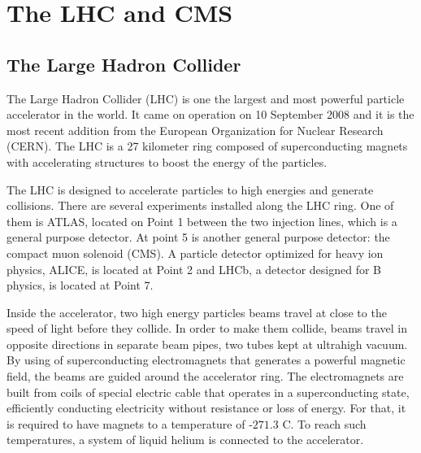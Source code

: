 
\chapter{The LHC and CMS}

\section{The Large Hadron Collider}

The Large Hadron Collider (LHC) is one the largest and most powerful particle accelerator in the world. It came on operation on 10 September 2008 and it is the most recent addition from the European Organization for Nuclear Research (CERN). The LHC is a 27 kilometer ring composed of superconducting magnets with accelerating structures to boost the energy of the particles. 

The LHC is designed to accelerate particles to high energies and generate collisions. There are several
experiments installed along the LHC ring. One of them is ATLAS, located on Point 1 between the two injection lines, which is a general purpose detector. At point 5 is another general purpose detector: the compact muon solenoid (CMS). A particle detector optimized for heavy ion physics, ALICE, is located at Point 2 and LHCb, a detector designed for B physics, is located at Point 7.\cite{cern1,cern2}


Inside the accelerator, two high energy particles beams travel at
close to the speed of light before they collide. 
In order to make them collide, beams travel in opposite directions in separate beam pipes, 
two tubes kept at ultrahigh vacuum. 
By using of superconducting electromagnets that generates a powerful magnetic field, the beams are guided around the accelerator ring. 
The electromagnets are built from coils of special electric cable that operates in a superconducting state, efficiently conducting electricity without resistance or loss of energy. For that, it is required to have magnets to a temperature of $‑271.3$ C. 
To reach such temperatures, a system of liquid helium is connected to the accelerator.\cite{cern2}

\pagebreak

